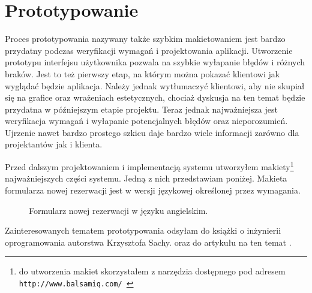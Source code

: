 \documentclass[a4paper,onecolumn,oneside,11pt,wide,floatssmall]{mwrep}
\def\url#1{{ \tt #1}}
\theoremstyle{definition}
\theoremstyle{plain}%
\theoremstyle{remark}
\begin{document}
\section{Prototypowanie}
Proces prototypowania nazywany także szybkim makietowaniem jest bardzo przydatny podczas weryfikacji wymagań i 
projektowania aplikacji. Utworzenie prototypu interfejsu użytkownika pozwala na szybkie wyłapanie błędów i różnych 
braków. Jest to też pierwszy etap, na którym można pokazać klientowi jak wyglądać będzie aplikacja. Należy jednak 
wytłumaczyć klientowi, aby nie skupiał się na grafice oraz wrażeniach estetycznych, chociaż dyskusja na ten temat 
będzie przydatna w późniejszym etapie projektu. Teraz jednak najważniejsza jest weryfikacja wymagań i wyłapanie 
potencjalnych błędów oraz nieporozumień. Ujrzenie nawet bardzo prostego szkicu daje bardzo wiele informacji zarówno 
dla projektantów jak i klienta.

Przed dalszym projektowaniem i implementacją systemu utworzyłem makiety\footnote{do utworzenia makiet skorzystałem z narzędzia dostępnego pod adresem \url{http://www.balsamiq.com/ }} najważniejszych części systemu. Jedną z nich przedstawiam poniżej. Makieta formularza nowej rezerwacji jest w wersji językowej określonej przez wymagania.

\begin{figure}[H]
  \begin{center}
  \end{center}
  \caption{Formularz nowej rezerwacji w języku angielskim.}
  \label{fig:mockup-new-resveration-horizontal}
\end{figure}

Zainteresowanych tematem prototypowania odsyłam do książki o inżynierii oprogramowania autorstwa Krzysztofa Sachy. \cite[str. 71]{sacha2010inzynieria} oraz do artykułu na ten temat \cite{wireframes2012infoq}.
\end{document}
